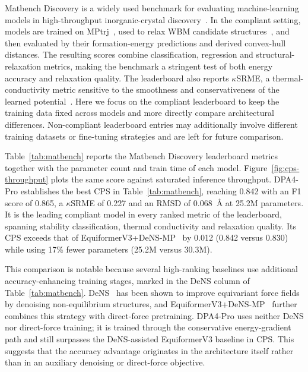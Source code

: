 Matbench Discovery is a widely used benchmark for evaluating machine-learning models in high-throughput inorganic-crystal discovery~\cite{riebesell2025matbench}.
In the compliant setting, models are trained on MPtrj~\cite{deng2023chgnet}, used to relax WBM candidate structures~\cite{WBM}, and then evaluated by their formation-energy predictions and derived convex-hull distances.
The resulting scores combine classification, regression and structural-relaxation metrics, making the benchmark a stringent test of both energy accuracy and relaxation quality.
The leaderboard also reports $\kappa$SRME, a thermal-conductivity metric sensitive to the smoothness and conservativeness of the learned potential~\cite{pota2024thermal}.
Here we focus on the compliant leaderboard to keep the training data fixed across models and more directly compare architectural differences.
Non-compliant leaderboard entries may additionally involve different training datasets or fine-tuning strategies and are left for future comparison.

Table~\ref{tab:matbench} reports the Matbench Discovery leaderboard metrics together with the parameter count and train time of each model.
Figure~\ref{fig:cps-throughput} plots the same score against saturated inference throughput.
DPA4-Pro establishes the best CPS in Table~\ref{tab:matbench}, reaching 0.842 with an F1 score of 0.865, a $\kappa$SRME of 0.227 and an RMSD of 0.068~\AA{} at 25.2M parameters.
It is the leading compliant model in every ranked metric of the leaderboard, spanning stability classification, thermal conductivity and relaxation quality.
Its CPS exceeds that of EquiformerV3+DeNS-MP~\cite{liao2026equiformerv3,liao2024dens} by 0.012 (0.842 versus 0.830) while using 17\% fewer parameters (25.2M versus 30.3M).

This comparison is notable because several high-ranking baselines use additional accuracy-enhancing training stages, marked in the DeNS column of Table~\ref{tab:matbench}.
DeNS~\cite{liao2024dens} has been shown to improve equivariant force fields by denoising non-equilibrium structures, and EquiformerV3+DeNS-MP~\cite{liao2026equiformerv3} further combines this strategy with direct-force pretraining.
DPA4-Pro uses neither DeNS nor direct-force training; it is trained through the conservative energy-gradient path and still surpasses the DeNS-assisted EquiformerV3 baseline in CPS.
This suggests that the accuracy advantage originates in the architecture itself rather than in an auxiliary denoising or direct-force objective.

